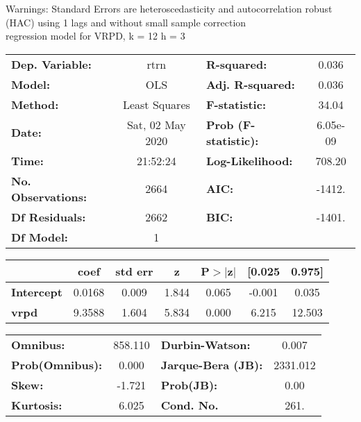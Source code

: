 Warnings: \newline
 [1] Standard Errors are heteroscedasticity and autocorrelation robust (HAC) using 1 lags and without small sample correction\\ 

regression model for VRPD, k = 12 h = 3\begin{center}
\begin{tabular}{lclc}
\toprule
\textbf{Dep. Variable:}    &       rtrn       & \textbf{  R-squared:         } &     0.036   \\
\textbf{Model:}            &       OLS        & \textbf{  Adj. R-squared:    } &     0.036   \\
\textbf{Method:}           &  Least Squares   & \textbf{  F-statistic:       } &     34.04   \\
\textbf{Date:}             & Sat, 02 May 2020 & \textbf{  Prob (F-statistic):} &  6.05e-09   \\
\textbf{Time:}             &     21:52:24     & \textbf{  Log-Likelihood:    } &    708.20   \\
\textbf{No. Observations:} &        2664      & \textbf{  AIC:               } &    -1412.   \\
\textbf{Df Residuals:}     &        2662      & \textbf{  BIC:               } &    -1401.   \\
\textbf{Df Model:}         &           1      & \textbf{                     } &             \\
\bottomrule
\end{tabular}
\begin{tabular}{lcccccc}
                   & \textbf{coef} & \textbf{std err} & \textbf{z} & \textbf{P$> |$z$|$} & \textbf{[0.025} & \textbf{0.975]}  \\
\midrule
\textbf{Intercept} &       0.0168  &        0.009     &     1.844  &         0.065        &       -0.001    &        0.035     \\
\textbf{vrpd}      &       9.3588  &        1.604     &     5.834  &         0.000        &        6.215    &       12.503     \\
\bottomrule
\end{tabular}
\begin{tabular}{lclc}
\textbf{Omnibus:}       & 858.110 & \textbf{  Durbin-Watson:     } &    0.007  \\
\textbf{Prob(Omnibus):} &   0.000 & \textbf{  Jarque-Bera (JB):  } & 2331.012  \\
\textbf{Skew:}          &  -1.721 & \textbf{  Prob(JB):          } &     0.00  \\
\textbf{Kurtosis:}      &   6.025 & \textbf{  Cond. No.          } &     261.  \\
\bottomrule
\end{tabular}
\end{center}

